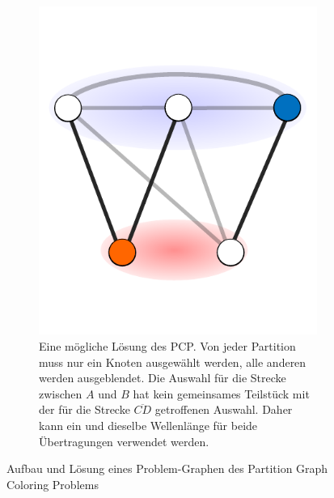 \begin{figure}
\begin{subfigure}[t]{0.3\textwidth}
		\includegraphics[width=\textwidth]{img/bsp5}
		\caption{Eine mögliche Lösung des PCP\@. Von jeder Partition muss nur ein Knoten ausgewählt werden, alle anderen werden ausgeblendet. Die Auswahl für die Strecke zwischen $A$ und $B$ hat kein gemeinsames Teilstück mit der für die Strecke $\overline{CD}$ getroffenen Auswahl. Daher kann ein und dieselbe Wellenlänge für beide Übertragungen verwendet werden.}
		\label{fig:example:e}
	\end{subfigure}
	
	\caption{Aufbau und Lösung eines Problem-Graphen des Partition Graph Coloring Problems}
\end{figure}

